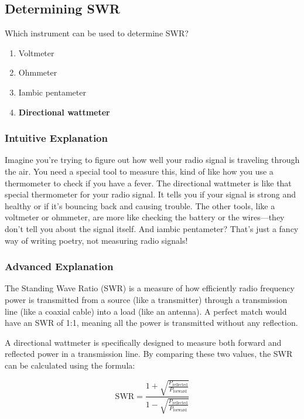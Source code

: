 \subsection{Determining SWR}
\label{T7C08}

\begin{tcolorbox}[colback=gray!10!white,colframe=black!75!black,title=T7C08]
Which instrument can be used to determine SWR?
\begin{enumerate}[label=\Alph*)]
    \item Voltmeter
    \item Ohmmeter
    \item Iambic pentameter
    \item \textbf{Directional wattmeter}
\end{enumerate}
\end{tcolorbox}

\subsubsection{Intuitive Explanation}
Imagine you're trying to figure out how well your radio signal is traveling through the air. You need a special tool to measure this, kind of like how you use a thermometer to check if you have a fever. The directional wattmeter is like that special thermometer for your radio signal. It tells you if your signal is strong and healthy or if it's bouncing back and causing trouble. The other tools, like a voltmeter or ohmmeter, are more like checking the battery or the wires—they don't tell you about the signal itself. And iambic pentameter? That's just a fancy way of writing poetry, not measuring radio signals!

\subsubsection{Advanced Explanation}
The Standing Wave Ratio (SWR) is a measure of how efficiently radio frequency power is transmitted from a source (like a transmitter) through a transmission line (like a coaxial cable) into a load (like an antenna). A perfect match would have an SWR of 1:1, meaning all the power is transmitted without any reflection. 

A directional wattmeter is specifically designed to measure both forward and reflected power in a transmission line. By comparing these two values, the SWR can be calculated using the formula:

\[
\text{SWR} = \frac{1 + \sqrt{\frac{P_{\text{reflected}}}{P_{\text{forward}}}}}{1 - \sqrt{\frac{P_{\text{reflected}}}{P_{\text{forward}}}}}
\]


